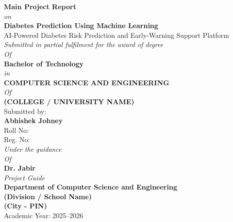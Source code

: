 \documentclass[12pt,a4paper]{report}
\begin{document}
\begin{titlepage}
    \centering
    \thispagestyle{empty}
    \vspace*{1.0cm}


    {\Huge \textbf{Main Project Report}}\\[0.15cm]
    {\Large \textit{on}}\\[0.15cm]
    {\LARGE \textbf{Diabetes Prediction Using Machine Learning}}\\[0.25cm]
    {\large AI-Powered Diabetes Risk Prediction and Early-Warning Support Platform}\\[0.45cm]

    {\Large \textit{Submitted in partial  fulfilment for the award of degree}}\\[0.2cm]
    {\Large \textit{Of}}\\[0.2cm]
    {\Large \textbf{Bachelor of Technology}}\\[0.2cm]
    {\Large \textit{in}}\\[0.2cm]
    {\Large \textbf{COMPUTER SCIENCE AND ENGINEERING}}\\[0.2cm]
    {\Large \textit{Of}}\\[0.2cm]
    {\Large \textbf{(COLLEGE / UNIVERSITY NAME)}}\\[0.45cm]

    {\Large Submitted by:}\\[0.2cm]
    {\large \textbf{Abhishek Johney}}\\
    {\large Roll No: \underline{\hspace{3.5cm}}}\\
    {\large Reg. No: \underline{\hspace{3.5cm}}}\\[0.35cm]

    {\Large \textit{Under the guidance}}\\[0.05cm]
    {\Large \textit{Of}}\\[0.05cm]
    {\Large \textbf{Dr. Jabir}}\\
    {\large \textit{Project Guide}}\\[0.35cm]

    {\Large \textbf{Department of Computer Science and Engineering}}\\
    {\Large \textbf{(Division / School Name)}}\\
    {\Large \textbf{(City - PIN)}}\\[0.55cm]

    {\large Academic Year: 2025--2026}
\end{titlepage}
\end{document}
